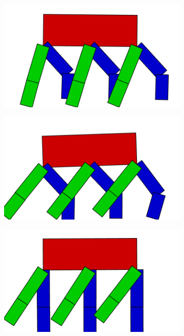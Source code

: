 \begin{figure}[H]
        \begin{subfigure}[b]{0.3\textwidth}
          \includegraphics[width=\linewidth,center]{graphics/movement/15}
          \caption{\label{fig:ConceptMovement15}}
        \end{subfigure}
        \hspace{\fill}
        \begin{subfigure}[b]{0.3\textwidth}
          \includegraphics[width=\linewidth,center]{graphics/movement/20}
          \caption{\label{fig:ConceptMovement20}}
        \end{subfigure}
        \hspace{\fill}
        \begin{subfigure}[b]{0.3\textwidth}
          \includegraphics[width=\linewidth,center]{graphics/movement/30}
          \caption{\label{fig:ConceptMovement30}}
        \end{subfigure}


\end{figure}
